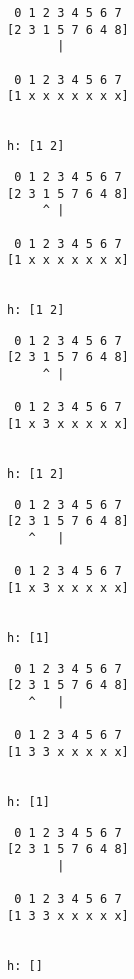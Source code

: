 { \begin{verbatim}
                    0 1 2 3 4 5 6 7
                   [2 3 1 5 7 6 4 8]
                          |

                    0 1 2 3 4 5 6 7
                   [1 x x x x x x x]


                   h: [1 2]
\end{verbatim} }

{ \begin{verbatim}
                    0 1 2 3 4 5 6 7
                   [2 3 1 5 7 6 4 8]
                        ^ |

                    0 1 2 3 4 5 6 7
                   [1 x x x x x x x]


                   h: [1 2]
\end{verbatim} }

{ \begin{verbatim}
                    0 1 2 3 4 5 6 7
                   [2 3 1 5 7 6 4 8]
                        ^ |

                    0 1 2 3 4 5 6 7
                   [1 x 3 x x x x x]


                   h: [1 2]
\end{verbatim} }

{ \begin{verbatim}
                    0 1 2 3 4 5 6 7
                   [2 3 1 5 7 6 4 8]
                      ^   |

                    0 1 2 3 4 5 6 7
                   [1 x 3 x x x x x]


                   h: [1]
\end{verbatim} }

{ \begin{verbatim}
                    0 1 2 3 4 5 6 7
                   [2 3 1 5 7 6 4 8]
                      ^   |

                    0 1 2 3 4 5 6 7
                   [1 3 3 x x x x x]


                   h: [1]
\end{verbatim} }

{ \begin{verbatim}
                    0 1 2 3 4 5 6 7
                   [2 3 1 5 7 6 4 8]
                          |

                    0 1 2 3 4 5 6 7
                   [1 3 3 x x x x x]


                   h: []
\end{verbatim} }


